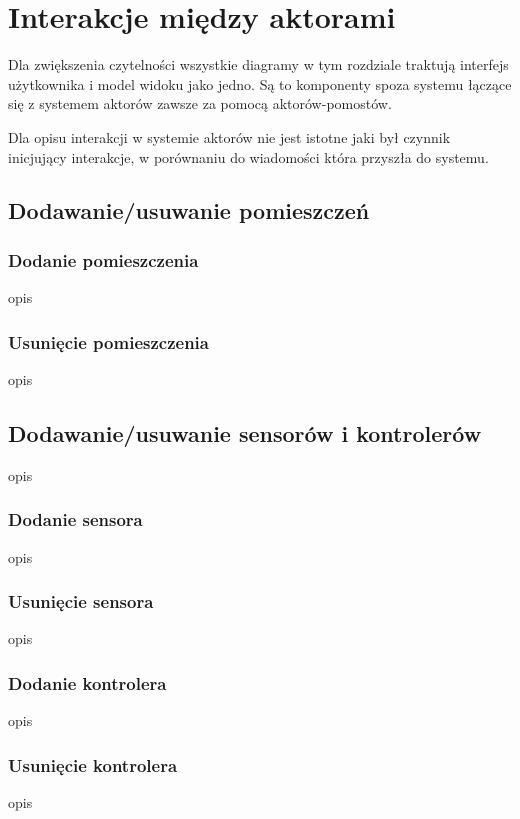 \chapter{Interakcje między aktorami}
Dla zwiększenia czytelności wszystkie diagramy w tym rozdziale traktują  interfejs użytkownika i model widoku jako jedno. Są to komponenty spoza systemu łączące się z systemem aktorów zawsze za pomocą aktorów-pomostów.

Dla opisu interakcji w systemie aktorów nie jest istotne jaki był czynnik inicjujący interakcje, w porównaniu do wiadomości która przyszła do systemu.

\section{Dodawanie/usuwanie pomieszczeń}

\subsection*{Dodanie pomieszczenia}
opis

\subsection*{Usunięcie pomieszczenia}
opis


\section{Dodawanie/usuwanie sensorów i kontrolerów}
opis
\subsection*{Dodanie sensora}
opis

\subsection*{Usunięcie sensora}
opis

\subsection*{Dodanie kontrolera}
opis

\subsection*{Usunięcie kontrolera}
opis


